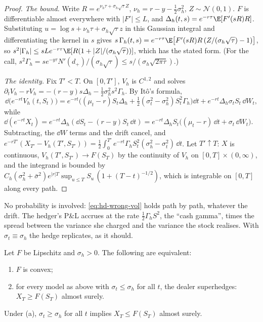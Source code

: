 \begin{proof}
\emph{The bound.} Write $R=e^{\nu_h\tau+\sigma_h\sqrt\tau Z}$, $\nu_h=r-y-\frac12\sigma_h^2$,
$Z\sim\mathcal N(0,1)$. $F$ is differentiable almost everywhere with $|F'|\le L$, and
$\Delta_h(t,s)=e^{-r\tau}\E[F'(sR)R]$. Substituting $u=\log s+\nu_h\tau+\sigma_h\sqrt\tau z$ in this
Gaussian integral and differentiating the kernel in $s$ gives
$s\,\Gamma_h(t,s)=e^{-r\tau}\E\big[F'(sR)R\,(Z/(\sigma_h\sqrt\tau)-1)\big]$, so
$s^2|\Gamma_h|\le sLe^{-r\tau}\E[R(1+|Z|/(\sigma_h\sqrt\tau))]$, which has the stated form. (For the call,
$s^2\Gamma_h=se^{-y\tau}N'(d_+)/(\sigma_h\sqrt\tau)\le s/(\sigma_h\sqrt{2\pi\tau})$.)

\emph{The identity.} Fix $T'<T$. On $[0,T']$, $V_h$ is $C^{1,2}$ and solves
$\partial_tV_h-rV_h=-(r-y)s\Delta_h-\frac12\sigma_h^2s^2\Gamma_h$. By It\^o's formula,
\[
  \dd\big(e^{-rt}V_h(t,S_t)\big)=e^{-rt}\Big((\mu_t-r)S_t\Delta_h+\tfrac12(\sigma_t^2-\sigma_h^2)S_t^2\Gamma_h\Big)\dd t
  +e^{-rt}\Delta_h\sigma_tS_t\,\dd W_t ,
\]
while $\dd(e^{-rt}X_t)=e^{-rt}\Delta_h(\dd S_t-(r-y)S_t\,\dd t)=e^{-rt}\Delta_hS_t\big((\mu_t-r)\,\dd t+\sigma_t\,\dd W_t\big)$.
Subtracting, the $\dd W$ terms and the drift cancel, and
$e^{-rT'}(X_{T'}-V_h(T',S_{T'}))=\frac12\int_0^{T'}e^{-rt}\Gamma_hS_t^2(\sigma_h^2-\sigma_t^2)\,\dd t$. Let
$T'\uparrow T$: $X$ is continuous, $V_h(T',S_{T'})\to F(S_T)$ by the continuity of $V_h$ on
$[0,T]\times(0,\infty)$, and the integrand is bounded by
$C_h(\sigma_h^2+\bar\sigma^2)e^{|r|T}\sup_{u\le T}S_u\,(1+(T-t)^{-1/2})$, which is integrable on $[0,T]$
along every path.
\end{proof}

No probability is involved: \eqref{eq:hd-wrong-vol} holds path by path, whatever the drift. The
hedger's P\&L accrues at the rate $\frac12\Gamma_hS^2$, the ``cash gamma'', times the spread between
the variance she charged and the variance the stock realises. With $\sigma_t\equiv\sigma_h$ the hedge
replicates, as it should.

\begin{corollary}[Robustness]\label{cor:hd-robust}
Let $F$ be Lipschitz and $\sigma_h>0$. The following are equivalent:
\begin{enumerate}[label=(\alph*)]
  \item $F$ is convex;
  \item for every model as above with $\sigma_t\le\sigma_h$ for all $t$, the dealer superhedges:
    $X_T\ge F(S_T)$ almost surely.
\end{enumerate}
Under (a), $\sigma_t\ge\sigma_h$ for all $t$ implies $X_T\le F(S_T)$ almost surely.
\end{corollary}

